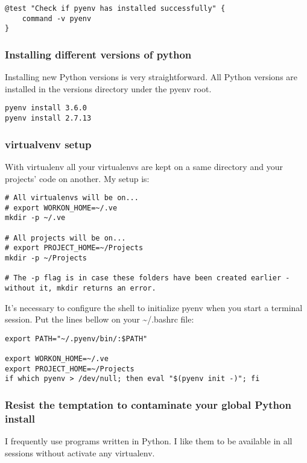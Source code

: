 \documentclass[11pt]{article}
\begin{document}
\begin{verbatim}
@test "Check if pyenv has installed successfully" {
    command -v pyenv
}
\end{verbatim}

\subsubsection{Installing different versions of python}
\label{sec:org96ce628}
Installing new Python versions is very straightforward. All Python versions are installed in the versions directory under the pyenv root.

\begin{verbatim}
pyenv install 3.6.0
pyenv install 2.7.13
\end{verbatim}

\subsubsection{virtualvenv setup}
\label{sec:org5c192fe}
With virtualenv all your virtualenvs are kept on a same directory and your projects' code on another. My setup is:
\begin{verbatim}
# All virtualenvs will be on...
# export WORKON_HOME=~/.ve
mkdir -p ~/.ve 

# All projects will be on...
# export PROJECT_HOME=~/Projects
mkdir -p ~/Projects 

# The -p flag is in case these folders have been created earlier - without it, mkdir returns an error.
\end{verbatim}

It's necessary to configure the shell to initialize pyenv when you start a terminal session. Put the lines bellow on your \textasciitilde{}/.bashrc file:
\begin{verbatim}
export PATH="~/.pyenv/bin/:$PATH"

export WORKON_HOME=~/.ve
export PROJECT_HOME=~/Projects
if which pyenv > /dev/null; then eval "$(pyenv init -)"; fi
\end{verbatim}

\subsubsection{Resist the temptation to contaminate your global Python install}
\label{sec:orga2d11bc}

I frequently use programs written in Python. I like them to be available in all sessions without activate any virtualenv.
\end{document}
